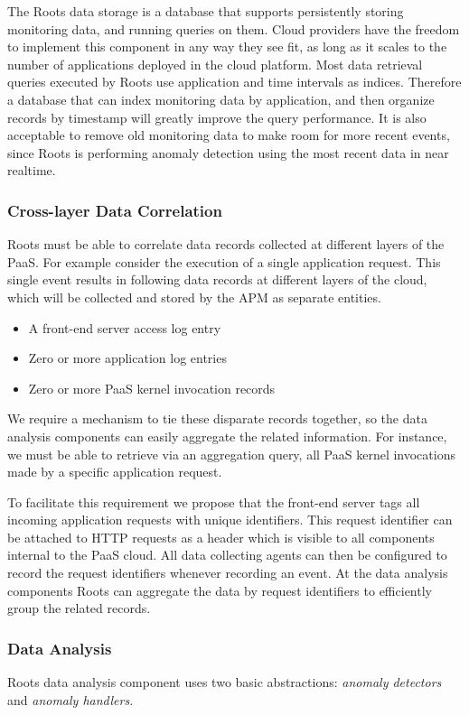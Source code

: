 The Roots data storage is a database that supports persistently storing monitoring data, and running
queries on them.  
Cloud providers have the freedom to implement this component in any way they see fit, as long
as it scales to the number of applications deployed in the cloud platform. Most data retrieval queries executed
by Roots use application and time intervals as indices. Therefore a database that can index monitoring
data by application, and then organize records by timestamp will greatly improve the query performance.
It is also acceptable to remove old monitoring data to make room for more recent events, since Roots
is performing anomaly detection using the most recent data in near realtime.

\subsubsection{Cross-layer Data Correlation}
Roots must be able to correlate data records collected at different layers of the PaaS. For example consider
the execution of a single application request. This single event results in following data records at
different layers of the cloud, which will be collected and stored by the APM as separate entities.

\begin{itemize}
\item A front-end server access log entry
\item Zero or more application log entries
\item Zero or more PaaS kernel invocation records
\end{itemize}

We require a mechanism to tie these disparate records together, so the data analysis components can easily
aggregate the related information. For instance, we must be able to retrieve via an
aggregation query, all PaaS kernel invocations made by a specific application request.

To facilitate this requirement we propose that the front-end server tags all incoming application requests 
with unique identifiers.
This request identifier can be attached to HTTP requests as a header which is visible to all components 
internal to the PaaS cloud. All data collecting agents can then be configured to record the request identifiers
whenever recording an event. At the data analysis components Roots can aggregate the data by request identifiers
to efficiently group the related records.

\subsubsection{Data Analysis}
Roots data analysis component uses two basic abstractions: \textit{anomaly detectors} 
and \textit{anomaly handlers}.

